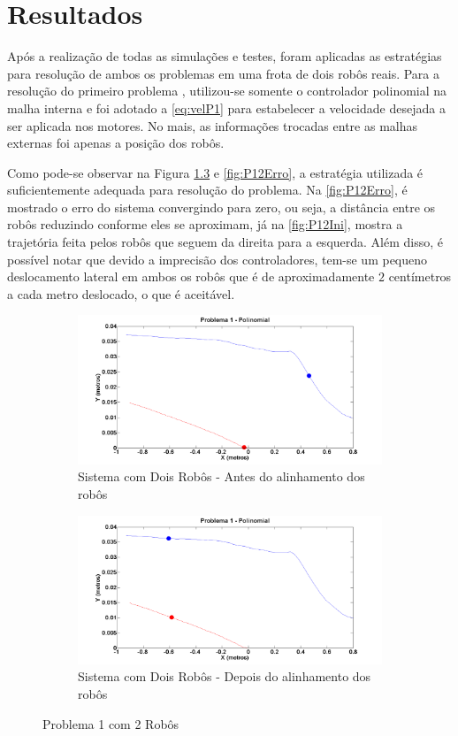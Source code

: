 \chapter{Resultados }
\label{chap:resultados}

Após a realização de todas as simulações e testes, foram aplicadas as estratégias para resolução de ambos os problemas em uma frota de dois robôs reais. Para a resolução do primeiro problema , utilizou-se somente o controlador polinomial na malha interna e foi adotado a \autoref{eq:velP1} para estabelecer a velocidade desejada a ser aplicada nos motores. No mais, as informações trocadas entre as malhas externas foi apenas a posição dos robôs. 

Como pode-se observar na Figura \ref{fig:sP12} e \ref{fig:P12Erro}, a estratégia utilizada é suficientemente adequada para resolução do problema. Na \autoref{fig:P12Erro}, é mostrado o erro do sistema convergindo para zero, ou seja, a distância entre os robôs reduzindo conforme eles se aproximam, já na \autoref{fig:P12Ini}, mostra a trajetória feita pelos robôs que seguem da direita para a esquerda. Além disso, é possível notar que devido a imprecisão dos controladores, tem-se um pequeno deslocamento lateral em ambos os robôs que é de aproximadamente $2$ centímetros a cada metro deslocado, o que é aceitável.

\begin{figure}[!htb]
	\centering
	\begin{subfigure}{1.0\textwidth}
		\centering
		\includegraphics[width=.9\linewidth]{./Testes/Problema1/Incremental/P1Antes}
		\caption{Sistema com Dois Robôs - Antes do alinhamento dos robôs}
		\label{fig:P12Ini}
	\end{subfigure}
	\begin{subfigure}{1.0\textwidth}
		\centering
		\includegraphics[width=.9\linewidth]{./Testes/Problema1/Incremental/P1Depois}
		\caption{Sistema com Dois Robôs - Depois do alinhamento dos robôs}
		\label{fig:P12Fim}
	\end{subfigure}
	\caption{Problema 1 com 2 Robôs}
	\label{fig:sP12}
\end{figure}

